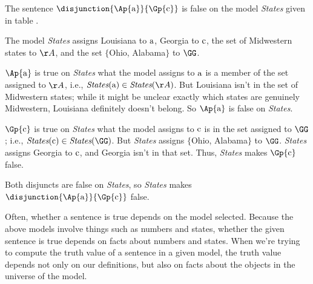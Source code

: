 \begin{majorILnc}{}
The sentence $\disjunction{\Ap{\constant{a}}}{\Gp{\constant{c}}}$ is false on the model \emph{States} given in table .
\end{majorILnc}
\begin{PROOF}
The model \emph{States} assigns Louisiana to $\mathrm{a}$, Georgia to $\mathrm{c}$, the set of Midwestern states to $\AA$, and the set $\{$Ohio, Alabama$\}$ to $\GG$.

$\Ap{\constant{a}}$ is true on \emph{States} \Iff what the model assigns to $\mathrm{a}$ is a member of the set assigned to $\AA$, i.e., $\emph{States}(\constant{a})\in\emph{States}(\AA)$.  But Louisiana isn't in the set of Midwestern states; while it might be unclear exactly which states are genuinely Midwestern, Louisiana definitely doesn't belong.  So $\Ap{\constant{a}}$ is false on \emph{States}.

$\Gp{\constant{c}}$ is true on \emph{States} \Iff what the model assigns to $\mathrm{c}$ is in the set assigned to $\GG$; i.e., \Iff $\emph{States}(\constant{c})\in\emph{States}(\GG)$.  But \emph{States} assigns $\{$Ohio, Alabama$\}$ to $\GG$.  \emph{States} assigns Georgia to $\mathrm{c}$, and Georgia isn't in that set.  Thus, \emph{States} makes $\Gp{\constant{c}}$ false.

Both disjuncts are false on \emph{States}, so \emph{States} makes $\disjunction{\Ap{\constant{a}}}{\Gp{\constant{c}}}$ false.
\end{PROOF}
\noindent{}Often, whether a sentence is true depends on the model selected.  Because the above models involve things such as numbers and states, whether the given sentence is true depends on facts about numbers and states. 
When we're trying to compute the truth value of a sentence in a given model, the truth value depends not only on our definitions, but also on facts about the objects in the universe of the model. 

